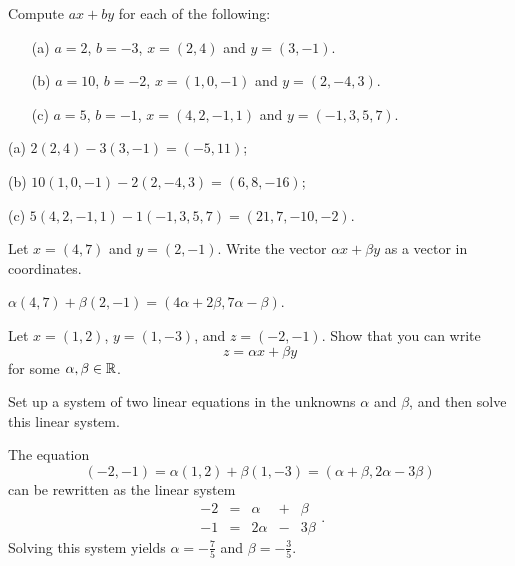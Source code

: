 \documentclass{ximera}
\begin{document}
\begin{exercise} \label{c4.3.1}
Compute $ax+by$ for each of the following:
\begin{itemize}
\item[(a)] $a=2$, $b=-3$, $x=(2,4)$ and $y=(3,-1)$.
\item[(b)] $a=10$, $b=-2$, $x=(1,0,-1)$ and $y=(2,-4,3)$.
\item[(c)] $a=5$, $b=-1$, $x=(4,2,-1,1)$ and $y=(-1,3,5,7)$.
\end{itemize}

\begin{solution}

(a) $2(2,4) - 3(3,-1) = (-5,11)$;

(b) $10(1,0,-1) - 2(2,-4,3) = (6,8,-16)$;

(c) $5(4,2,-1,1) - 1(-1,3,5,7) = (21,7,-10,-2)$.

\end{solution}
\end{exercise}

\begin{exercise} \label{c4.3.2}
Let $x=(4,7)$ and $y=(2,-1)$.  Write the vector $\alpha x+\beta
y$ as a vector in coordinates.

\begin{solution}

$\alpha (4,7) + \beta (2,-1) = (4\alpha + 2\beta, 7\alpha - \beta)$.

\end{solution}
\end{exercise}

\begin{exercise} \label{c4.3.3}
Let $x=(1,2)$, $y=(1,-3)$, and $z=(-2,-1)$.  Show that you can
write
\[
z=\alpha x+ \beta y
\]
for some $\alpha,\beta\in\mbox{$\Bbb{R}$}$.

 Set up a system of two linear equations in
the unknowns $\alpha$ and $\beta$, and then solve this linear
system.

\begin{solution}

The equation
\[ (-2, -1) = \alpha(1,2) + \beta(1,-3) =
(\alpha + \beta, 2\alpha - 3\beta ) \]
can be rewritten as the linear system
\[ \begin{array}{rrrrr}
-2 & = & \alpha & + & \beta \\
-1 & = & 2\alpha & - & 3\beta\end{array}. \]
Solving this system yields $\alpha = -\frac{7}{5}$ and
$\beta = -\frac{3}{5}$.

\end{solution}
\end{exercise}
\end{document}
